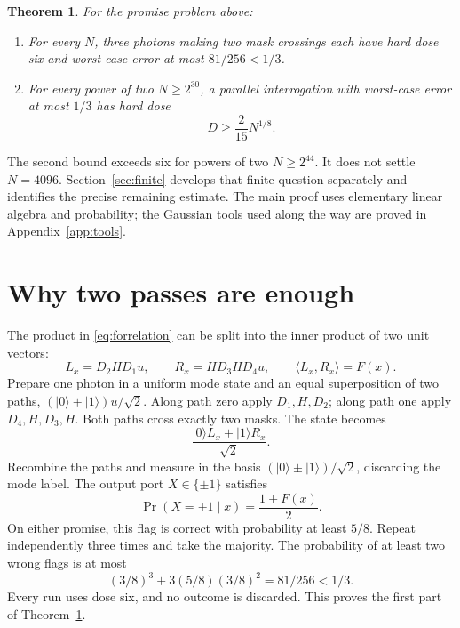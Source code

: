 \documentclass[11pt]{article}
\newtheorem{theorem}{Theorem}
\newcommand{\1}{\mathbf 1}
\begin{document}
\begin{theorem}\label{thm:main}
For the promise problem above:
\begin{enumerate}
\item For every $N$, three photons making two mask crossings each have
hard dose six and worst-case error at most $81/256<1/3$.
\item For every power of two $N\ge2^{30}$, a parallel interrogation
with worst-case error at most $1/3$ has hard dose
\[
                         D\ge\frac{2}{15}N^{1/8}.
\]
\end{enumerate}
\end{theorem}

The second bound exceeds six for powers of two $N\ge2^{44}$.
It does not settle $N=4096$. Section~\ref{sec:finite} develops that
finite question separately and identifies the precise remaining estimate.
The main proof uses elementary linear algebra and probability; the
Gaussian tools used along the way are proved in Appendix~\ref{app:tools}.

\section{Why two passes are enough}
The product in \eqref{eq:forrelation} can be split into the inner product
of two unit vectors:
\[
 L_x=D_2HD_1u,\qquad R_x=HD_3HD_4u,\qquad
 \langle L_x,R_x\rangle=F(x).
\]
Prepare one photon in a uniform mode state and an equal superposition
of two paths, $(|0\rangle+|1\rangle)u/\sqrt2$.
Along path zero apply $D_1,H,D_2$; along path one apply $D_4,H,D_3,H$.
Both paths cross exactly two masks. The state becomes
\[
             \frac{|0\rangle L_x+|1\rangle R_x}{\sqrt2}.
\]
Recombine the paths and measure in the basis
$(|0\rangle\pm|1\rangle)/\sqrt2$, discarding the mode label.
The output port $X\in\{\pm1\}$ satisfies
\[
 \Pr(X=\pm1\mid x)=\frac{1\pm F(x)}2.
\]
On either promise, this flag is correct with probability at least $5/8$.
Repeat independently three times and take the majority. The probability
of at least two wrong flags is at most
\[
                 (3/8)^3+3(5/8)(3/8)^2=81/256<1/3.
\]
Every run uses dose six, and no outcome is discarded. This proves the
first part of Theorem~\ref{thm:main}.
\end{document}
